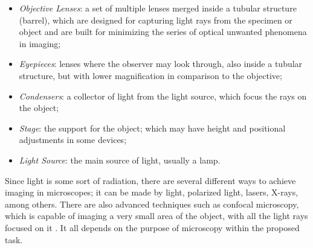 \begin{itemize}
    
    \item \emph{Objective Lenses}: a set of multiple lenses merged inside a tubular structure (barrel), which are designed for capturing light rays from the specimen or object and are built for minimizing the series of optical unwanted phenomena in imaging;

    \item \emph{Eyepieces}: lenses where the observer may look through, also inside a tubular structure, but with lower magnification in comparison to the objective;

    \item \emph{Condensers}: a collector of light from the light source, which focus the rays on the object;
    
    \item \emph{Stage}: the support for the object; which may have height and positional adjustments in some devices;
    
    \item \emph{Light Source}: the main source of light, usually a lamp.
\end{itemize}

Since light is some sort of radiation, there are several different ways to achieve imaging in microscopes; it can be made by light, polarized light, lasers, X-rays, among others. There are also advanced techniques such as confocal microscopy, which is capable of imaging a very small area of the object, with all the light rays focused on it \cite{rochow1994introduction}. It all depends on the purpose of microscopy within the proposed task.



